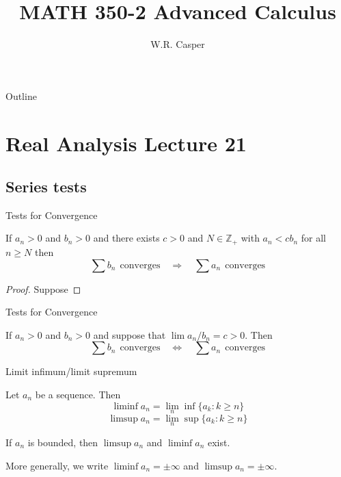\documentclass{beamer}
\title{MATH 350-2 Advanced Calculus}
\subtitle
{} %
\author[W.R. Casper] %
{W.R. Casper}
\institute[California State University Fullerton] %
{
  Department of Mathematics\\
  California State University Fullerton}
\begin{document}
\begin{frame}
  \titlepage
\end{frame}

\begin{frame}{Outline}
  \tableofcontents
\end{frame}



\section{Real Analysis Lecture 21}

\subsection{Series tests}

\begin{frame}{Tests for Convergence}
\begin{thm}
If $a_n>0$ and $b_n > 0$ and there exists $c>0$ and $N\in\mathbb Z_+$ with $a_n < cb_n$ for all $n\geq N$ then
$$\sum b_n\ \ \text{converges}\quad \Rightarrow\quad\sum a_n\ \ \text{converges}$$
\end{thm}
\end{frame}

\begin{frame}
\begin{proof}
Suppose 
\end{proof}
\end{frame}

\begin{frame}{Tests for Convergence}
\begin{thm}
If $a_n>0$ and $b_n > 0$ and suppose that $\lim a_n/b_n = c > 0$.  Then
$$\sum b_n\ \ \text{converges}\quad \Leftrightarrow\quad\sum a_n\ \ \text{converges}$$
\end{thm}
\end{frame}

\begin{frame}{Limit infimum/limit supremum}
\begin{defn}
Let $a_n$ be a sequence.  Then
$$\liminf a_n = \lim_n \inf\{a_k: k\geq n\}$$
$$\limsup a_n = \lim_n \sup\{a_k: k\geq n\}$$
\end{defn}
\begin{thm}
If $a_n$ is bounded, then $\limsup a_n$ and $\liminf a_n$ exist.
\end{thm}
More generally, we write $\liminf a_n = \pm\infty$ and $\limsup a_n = \pm \infty$.
\end{frame}
\end{document}
